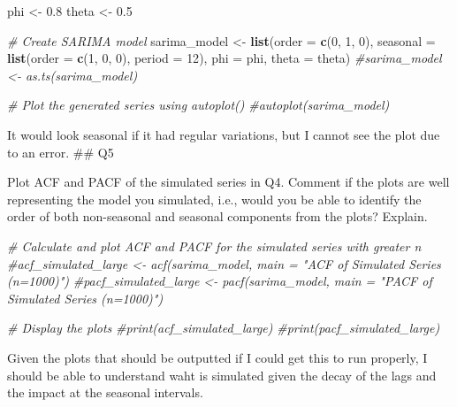 \documentclass[
]{article}
\newenvironment{Shaded}{\begin{snugshade}}{\end{snugshade}}
\newcommand{\AttributeTok}[1]{\textcolor[rgb]{0.13,0.29,0.53}{#1}}
\newcommand{\CommentTok}[1]{\textcolor[rgb]{0.56,0.35,0.01}{\textit{#1}}}
\newcommand{\DecValTok}[1]{\textcolor[rgb]{0.00,0.00,0.81}{#1}}
\newcommand{\FloatTok}[1]{\textcolor[rgb]{0.00,0.00,0.81}{#1}}
\newcommand{\FunctionTok}[1]{\textcolor[rgb]{0.13,0.29,0.53}{\textbf{#1}}}
\newcommand{\NormalTok}[1]{#1}
\newcommand{\OtherTok}[1]{\textcolor[rgb]{0.56,0.35,0.01}{#1}}
\begin{document}
\begin{Shaded}
\begin{Highlighting}[]
\NormalTok{phi }\OtherTok{\textless{}{-}} \FloatTok{0.8}
\NormalTok{theta }\OtherTok{\textless{}{-}} \FloatTok{0.5}

\CommentTok{\# Create SARIMA model}
\NormalTok{sarima\_model }\OtherTok{\textless{}{-}} \FunctionTok{list}\NormalTok{(}\AttributeTok{order =} \FunctionTok{c}\NormalTok{(}\DecValTok{0}\NormalTok{, }\DecValTok{1}\NormalTok{, }\DecValTok{0}\NormalTok{), }\AttributeTok{seasonal =} \FunctionTok{list}\NormalTok{(}\AttributeTok{order =} \FunctionTok{c}\NormalTok{(}\DecValTok{1}\NormalTok{, }\DecValTok{0}\NormalTok{, }\DecValTok{0}\NormalTok{), }\AttributeTok{period =} \DecValTok{12}\NormalTok{), }\AttributeTok{phi =}\NormalTok{ phi, }\AttributeTok{theta =}\NormalTok{ theta)}
\CommentTok{\#sarima\_model \textless{}{-} as.ts(sarima\_model)}

\CommentTok{\# Plot the generated series using autoplot()}
\CommentTok{\#autoplot(sarima\_model)}
\end{Highlighting}
\end{Shaded}

It would look seasonal if it had regular variations, but I cannot see
the plot due to an error. \#\# Q5

Plot ACF and PACF of the simulated series in Q4. Comment if the plots
are well representing the model you simulated, i.e., would you be able
to identify the order of both non-seasonal and seasonal components from
the plots? Explain.

\begin{Shaded}
\begin{Highlighting}[]
\CommentTok{\# Calculate and plot ACF and PACF for the simulated series with greater n}
\CommentTok{\#acf\_simulated\_large \textless{}{-} acf(sarima\_model, main = "ACF of Simulated Series (n=1000)")}
\CommentTok{\#pacf\_simulated\_large \textless{}{-} pacf(sarima\_model, main = "PACF of Simulated Series (n=1000)")}

\CommentTok{\# Display the plots}
\CommentTok{\#print(acf\_simulated\_large)}
\CommentTok{\#print(pacf\_simulated\_large)}
\end{Highlighting}
\end{Shaded}

Given the plots that should be outputted if I could get this to run
properly, I should be able to understand waht is simulated given the
decay of the lags and the impact at the seasonal intervals.
\end{document}
